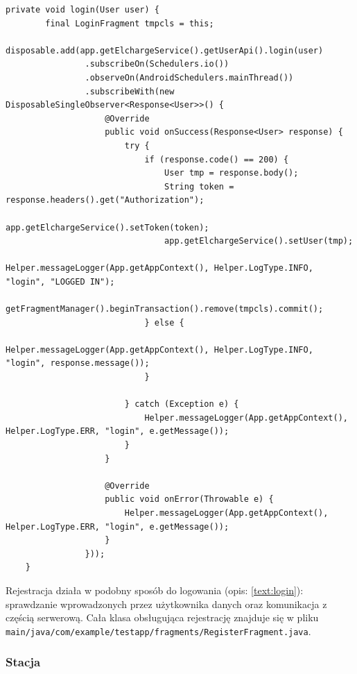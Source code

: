 \begin{lstlisting}[label=list:android_login_async,caption=Logowanie: wysłanie zapytania i obsługa odpowiedzi.,basicstyle=\tiny\ttfamily]
    private void login(User user) {
        final LoginFragment tmpcls = this;
        disposable.add(app.getElchargeService().getUserApi().login(user)
                .subscribeOn(Schedulers.io())
                .observeOn(AndroidSchedulers.mainThread())
                .subscribeWith(new DisposableSingleObserver<Response<User>>() {
                    @Override
                    public void onSuccess(Response<User> response) {
                        try {
                            if (response.code() == 200) {
                                User tmp = response.body();
                                String token = response.headers().get("Authorization");
                                app.getElchargeService().setToken(token);
                                app.getElchargeService().setUser(tmp);
                                Helper.messageLogger(App.getAppContext(), Helper.LogType.INFO, "login", "LOGGED IN");
                                getFragmentManager().beginTransaction().remove(tmpcls).commit();
                            } else {
                                Helper.messageLogger(App.getAppContext(), Helper.LogType.INFO, "login", response.message());
                            }

                        } catch (Exception e) {
                            Helper.messageLogger(App.getAppContext(), Helper.LogType.ERR, "login", e.getMessage());
                        }
                    }

                    @Override
                    public void onError(Throwable e) {
                        Helper.messageLogger(App.getAppContext(), Helper.LogType.ERR, "login", e.getMessage());
                    }
                }));
    }
\end{lstlisting}

Rejestracja działa w podobny sposób do logowania (opis: \ref{text:login}): sprawdzanie wprowadzonych przez użytkownika danych oraz komunikacja z częścią serwerową. Cała klasa obsługująca rejestrację znajduje się w pliku \texttt{main/java/com/example/testapp/fragments/RegisterFragment.java}.

\subsubsection{Stacja}
